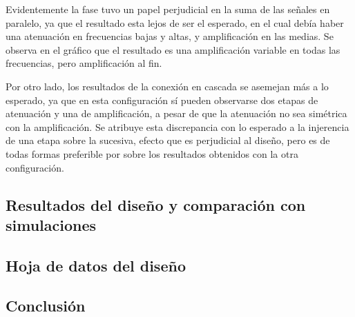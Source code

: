 Evidentemente la fase tuvo un papel perjudicial en la suma de las señales en paralelo, ya que el resultado esta lejos de ser el esperado, en el cual debía haber una 
atenuación en frecuencias bajas y altas, y amplificación en las medias.
Se observa en el gráfico que el resultado es una amplificación variable en todas las frecuencias, pero amplificación al fin. \par
Por otro lado, los resultados de la conexión en cascada se asemejan más a lo esperado, ya que en esta configuración sí pueden observarse dos etapas de atenuación y una de 
amplificación, a pesar de que la atenuación no sea simétrica con la amplificación. Se atribuye esta discrepancia con lo esperado a la injerencia de una etapa sobre la 
sucesiva, efecto que es perjudicial al diseño, pero es de todas formas preferible por sobre los resultados obtenidos con la otra configuración.



\subsection{Resultados del diseño y comparación con simulaciones}



\subsection{Hoja de datos del diseño}



\subsection{Conclusión}